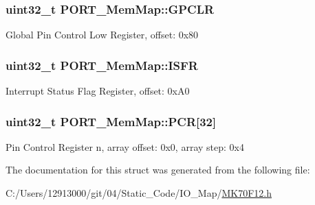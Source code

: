 \subsubsection[{G\+P\+C\+L\+R}]{\setlength{\rightskip}{0pt plus 5cm}uint32\+\_\+t P\+O\+R\+T\+\_\+\+Mem\+Map\+::\+G\+P\+C\+L\+R}\label{struct_p_o_r_t___mem_map_a837c289643f8cec958b1f01c086b558a}
Global Pin Control Low Register, offset\+: 0x80 \hypertarget{struct_p_o_r_t___mem_map_a53c86a08f430dc915a312efe74ba83e6}{}
\subsubsection[{I\+S\+F\+R}]{\setlength{\rightskip}{0pt plus 5cm}uint32\+\_\+t P\+O\+R\+T\+\_\+\+Mem\+Map\+::\+I\+S\+F\+R}\label{struct_p_o_r_t___mem_map_a53c86a08f430dc915a312efe74ba83e6}
Interrupt Status Flag Register, offset\+: 0x\+A0 \hypertarget{struct_p_o_r_t___mem_map_a1c54a8f1741fade8daf28198fee43ddd}{}
\subsubsection[{P\+C\+R}]{\setlength{\rightskip}{0pt plus 5cm}uint32\+\_\+t P\+O\+R\+T\+\_\+\+Mem\+Map\+::\+P\+C\+R\mbox{[}32\mbox{]}}\label{struct_p_o_r_t___mem_map_a1c54a8f1741fade8daf28198fee43ddd}
Pin Control Register n, array offset\+: 0x0, array step\+: 0x4 

The documentation for this struct was generated from the following file\+:\begin{DoxyCompactItemize}
\item 
C\+:/\+Users/12913000/git/04/\+Static\+\_\+\+Code/\+I\+O\+\_\+\+Map/\hyperlink{_m_k70_f12_8h}{M\+K70\+F12.\+h}\end{DoxyCompactItemize}
